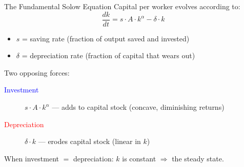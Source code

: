 \documentclass[aspectratio=169, 10pt]{beamer}
\begin{document}
\begin{frame}{The Fundamental Solow Equation}
Capital per worker evolves according to:
\[
  \boxed{\frac{dk}{dt} = s \cdot A \cdot k^{\alpha} - \delta \cdot k}
\]
\begin{itemize}
  \item $s$ = saving rate (fraction of output saved and invested)
  \item $\delta$ = depreciation rate (fraction of capital that wears out)
\end{itemize}
\vspace{0.5em}
Two opposing forces:
\begin{description}
  \item[\textcolor{blue}{Investment}] $s \cdot A \cdot k^{\alpha}$
        --- adds to capital stock (concave, diminishing returns)
  \item[\textcolor{red}{Depreciation}] $\delta \cdot k$
        --- erodes capital stock (linear in $k$)
\end{description}
\vspace{0.3em}
When investment $=$ depreciation: $k$ is constant $\Rightarrow$
the \alert{steady state}.
\end{frame}
\end{document}
